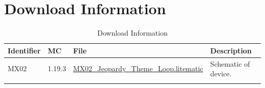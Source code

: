 \documentclass[10pt]{datasheet}
\begin{document}
\section{Download Information}
\begin{table}[h]
    \caption{Download Information}
    \begin{tabularx}{\textwidth}{l | l | l | X}
        \thickhline
        \textbf{Identifier} & \textbf{MC} & \textbf{File} & \textbf{Description} \\
        \hline
        MX02 & 1.19.3 & \href{https://github.com/Soontech-Annals/Archive/blob/8413f90a054b6c415703bae02badeba7541344f6/Archive/everything-bagel/MX02\%20Jeopardy\%20Theme\%20Loop/MX02\_Jeopardy\_Theme\_Loop.litematic?raw=1}{MX02\_Jeopardy\_Theme\_Loop.litematic} & Schematic of device. \\
        \hline
        \thickhline
    \end{tabularx}
\end{table}
\end{document}
